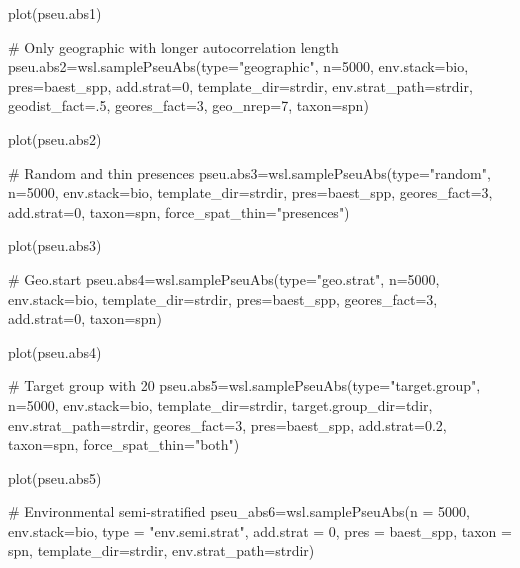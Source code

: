 \documentclass[a4paper]{book}
\begin{document}
\begin{Examples}
\begin{ExampleCode}
plot(pseu.abs1)

# Only geographic with longer autocorrelation length
pseu.abs2=wsl.samplePseuAbs(type="geographic",
                           n=5000,
                           env.stack=bio,
                           pres=baest_spp,
                           add.strat=0,
                           template_dir=strdir,
                           env.strat_path=strdir,
                           geodist_fact=.5,
                           geores_fact=3,
                           geo_nrep=7,
                           taxon=spn)

plot(pseu.abs2)

# Random and thin presences
pseu.abs3=wsl.samplePseuAbs(type="random",
                           n=5000,
                           env.stack=bio,
                           template_dir=strdir,
                           pres=baest_spp,
                           geores_fact=3,
                           add.strat=0,
                           taxon=spn,
                           force_spat_thin="presences")

plot(pseu.abs3)

# Geo.start
pseu.abs4=wsl.samplePseuAbs(type="geo.strat",
                           n=5000,
                           env.stack=bio,
                           template_dir=strdir,
                           pres=baest_spp,
                           geores_fact=3,
                           add.strat=0,
                           taxon=spn)

plot(pseu.abs4)

# Target group with 20%
pseu.abs5=wsl.samplePseuAbs(type="target.group",
                         n=5000,
                         env.stack=bio,
                         template_dir=strdir,
                         target.group_dir=tdir,
                         env.strat_path=strdir,
                         geores_fact=3,
                         pres=baest_spp,
                         add.strat=0.2,
                         taxon=spn,
                         force_spat_thin="both")

plot(pseu.abs5)

# Environmental semi-stratified
pseu_abs6=wsl.samplePseuAbs(n = 5000,
                           env.stack=bio,
                           type = "env.semi.strat",
                           add.strat = 0,
                           pres = baest_spp,
                           taxon = spn,
                           template_dir=strdir,
                           env.strat_path=strdir)


\end{ExampleCode}
\end{Examples}
\end{document}
